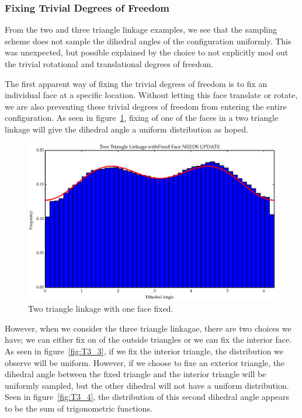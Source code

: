 \subsubsection{Fixing Trivial Degrees of Freedom}
From the two and three triangle linkage examples, we see that the sampling scheme does not sample the dihedral angles of the configuration uniformly. This was unexpected, but possible explained by the choice to not explicitly mod out the trivial rotational and translational degrees of freedom. 

The first apparent way of fixing the trivial degrees of freedom is to fix an individual face at a specific location. Without letting this face translate or rotate, we are also preventing these trivial degrees of freedom from entering the entire configuration. As seen in figure~\ref{fig:T2_3}, fixing of one of the faces in a two triangle linkage will give the dihedral angle a uniform distribution as hoped. 
\begin{figure}[ht]
\centering
  \includegraphics[scale=0.6]{images/T2_3.eps}
\caption{Two triangle linkage with one face fixed.}
\label{fig:T2_3}
\end{figure}
However, when we consider the three triangle linkagae, there are two choices we have; we can either fix on of the outside triangles or we can fix the interior face. As seen in figure~\ref{fig:T3_3}, if we fix the interior triangle, the distribution we observe will be uniform. However, if we choose to fixe an exterior triangle, the dihedral angle between the fixed triangle and the interior triangle  will be uniformly sampled, but the other dihedral will not have a uniform distribution. Seen in figure~\ref{fig:T3_4}, the distribution of this second dihedral angle appears to be the sum of trigonometric functions.
